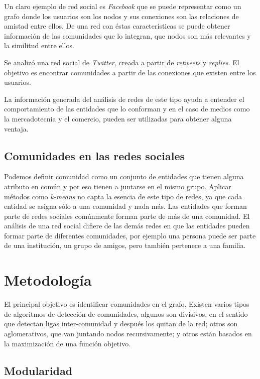 \documentclass{article}
\begin{document}
Un claro ejemplo de red social es \textit{Facebook} que se puede representar como un grafo donde los usuarios son los nodos y sus conexiones son las relaciones de amistad entre ellos. De una red con éstas características se puede obtener información de las comunidades que lo integran, que nodos son más relevantes y la similitud entre ellos. 

Se analizó una red social de \textit{Twitter}, creada a partir de \textit{retweets} y \textit{replies}. El objetivo es encontrar comunidades a partir de las conexiones que existen entre los usuarios.

La información generada del análisis de redes de este tipo ayuda a entender el comportamiento de las entidades que lo conforman y en el caso de medios como la mercadotecnia y el comercio, pueden ser utilizadas para obtener alguna ventaja.

\subsection{Comunidades en las redes sociales}

Podemos definir comunidad como un conjunto de entidades que tienen  alguna atributo en común y por eso tienen a juntarse en el mismo grupo. Aplicar métodos como \textit{k-means} no capta la esencia de este tipo de redes, ya que cada entidad se asigna sólo a una comunidad y nada más. Las entidades que forman parte de redes sociales comúnmente forman parte de más de una comunidad. El análisis de una red social difiere de las demás redes en que las entidades pueden formar parte de diferentes comunidades, por ejemplo una persona puede ser parte de una institución, un grupo de amigos, pero también pertenece a una familia. 

\section{Metodología}

El principal objetivo es identificar comunidades en el grafo. Existen varios tipos de algoritmos de detección de comunidades, algunos son divisivos, en el sentido que detectan ligas inter-comunidad y después los quitan de la red; otros son aglomerativos, que van juntando nodos recursivamente; y otros están basados en la maximización de una función objetivo.

\subsection{Modularidad}
\end{document}
